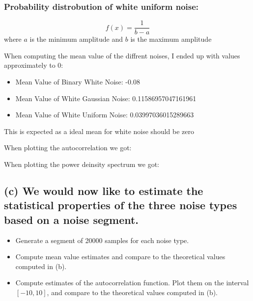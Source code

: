 \subsubsection*{Probability distrobution of white uniform noise:}
$$f(x)=\frac{1}{b-a}$$
where $a$ is the minimum amplitude and $b$ is the maximum amplitude

When computing the mean value of the diffrent noises, I ended up with values approximately to 0:
\begin{itemize}
    \item Mean Value of Binary White Noise: -0.08
    \item Mean Value of White Gaussian Noise: 0.11586957047161961
    \item Mean Value of White Uniform Noise: 0.03997036015289663
\end{itemize}
This is expected as a ideal mean for white noise should be zero

When plotting the autocorrelation we got:


When plotting the power deinsity spectrum we got:

\subsection*{(c) We would now like to estimate the statistical properties of the three noise types based on a noise segment.}
\begin{itemize}
    \item Generate a segment of 20000 samples for each noise type.
    \item Compute mean value estimates and compare to the theoretical values computed in (b).
    \item Compute estimates of the autocorrelation function. Plot them on the interval $[-10,10]$, and compare to the theoretical values computed in (b).
\end{itemize}



